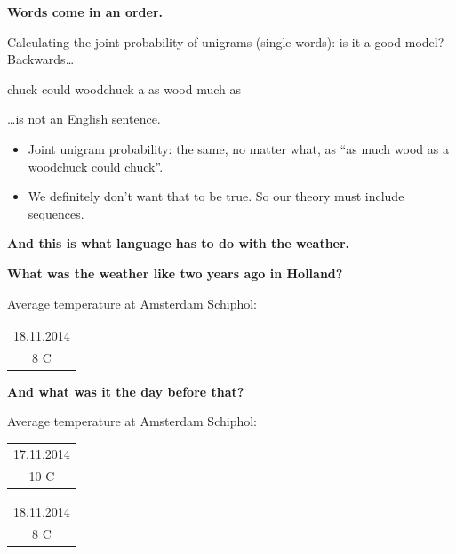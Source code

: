 \documentclass{beamer}
\newcommand{\placard}[1]{
  \begin{frame}
    \begin{center}
      \huge
      \textbf{#1}
    \end{center}
  \end{frame}
}
\newcommand{\pagestepalt}[2]{
  \begin{frame}[t]
    \begin{minipage}[t][0.26\textheight][t]{\textwidth}
      \begin{center}
        \huge
        \textbf{#1}
      \end{center}
    \end{minipage}
    
    \begin{minipage}[t][0.7\textheight][t]{\textwidth}
      #2
    \end{minipage}
  \end{frame}
}
\begin{document}
\pagestepalt{Words come in an order.}{
  Calculating the joint probability of \alert{unigrams} (single words):
  is it a good \alert{model}?\pause \\
  Backwards\ldots
  \begin{center}
    \Large chuck could woodchuck a as wood much as
  \end{center}
  \ldots is not an English sentence. \pause
  \begin{itemize}
  \item Joint unigram probability: the same, no matter what, as ``as much wood as a woodchuck could chuck''.\pause
  \item We definitely don't want that to be true.  So our theory must include
    sequences.
  \end{itemize}
}

\placard{And this is what language has to do with the weather.}

\pagestepalt{What was the weather like two years ago in Holland?}{
  Average temperature at Amsterdam Schiphol:\\
  \begin{flushright}
    \begin{tabular}{|c|}
      \hline
      18.11.2014 \\
      {\Huge 8 C} \\
      \hline
   \end{tabular}
  \end{flushright}
}

\pagestepalt{And what was it the day before that?}{
  Average temperature at Amsterdam Schiphol:\\
  \begin{flushright}
    \begin{tabular}{|c|}
      \hline
      17.11.2014 \\
      {\Huge 10 C} \\
      \hline
    \end{tabular}
    \begin{tabular}{|c|}
      \hline
      18.11.2014 \\
      {\Huge 8 C} \\
      \hline
    \end{tabular}
  \end{flushright}
}
\end{document}
